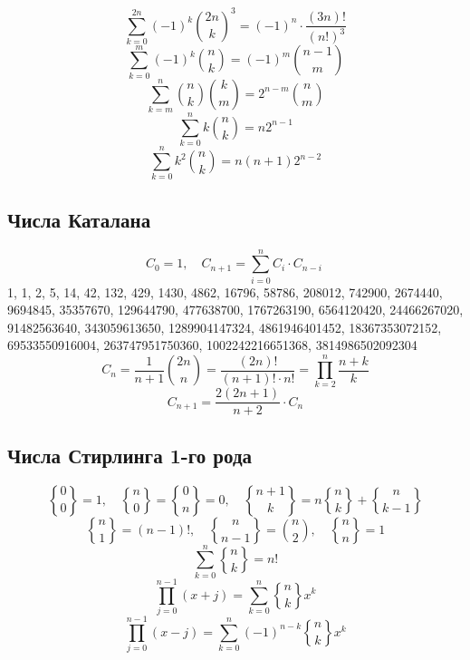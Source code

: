 \documentclass[11.5pt,a4paper,landscape,oneside]{amsart}
\newcommand{\Sequence}[1]{\subsection{#1}}
\newcommand{\stirlingii}{\genfrac{\{}{\}}{0pt}{}}
\begin{document}
\begin{multicols*}{2}
	\begin{equation}
		\sum_{k=0}^{2n}(-1)^k\binom{2n}{k}^3=(-1)^n\cdot\frac{(3n)!}{(n!)^3}
	\end{equation}
	\begin{equation}
		\sum_{k=0}^m (-1)^k\binom{n}{k} = (-1)^m\binom{n-1}{m}
	\end{equation}
	\begin{equation}
		\sum_{k=m}^n \binom{n}{k}\binom{k}{m} = 2^{n-m}\binom{n}{m}
	\end{equation}
	\begin{equation}
		\sum_{k=0}^n k \binom{n}{k} = n 2^{n-1}
	\end{equation}
	\begin{equation}
		\sum_{k=0}^n k^2 \binom{n}{k} = n(n + 1)2^{n-2}
	\end{equation}
	\Sequence{Числа Каталана}
	\begin{equation}
		C_0 = 1,\quad C_{n+1}=\sum_{i=0}^{n}C_i\cdot C_{n-i}\
	\end{equation}
	1, 1, 2, 5, 14, 42, 132, 429, 1430, 4862, 16796, 58786, 208012, 742900, 2674440, 9694845, 35357670, 129644790, 477638700, 1767263190, 6564120420, 24466267020, 91482563640, 343059613650, 1289904147324, 4861946401452, 18367353072152, 69533550916004, 263747951750360, 1002242216651368, 3814986502092304
	\begin{equation}
		C_n = \frac{1}{n+1}\binom{2n}{n} = \frac{(2n)!}{(n+1)!\cdot n!} = \prod_{k=2}^{n}\frac{n+k}{k}
	\end{equation}
	\begin{equation}
		C_{n+1}=\frac{2(2n+1)}{n+2}\cdot C_n
	\end{equation}
	\Sequence{Числа Стирлинга 1-го рода}
	\begin{equation}
		\stirlingii{0}{0} = 1,\quad\stirlingii{n}{0}=\stirlingii{0}{n}=0,\quad\stirlingii{n+1}{k} = n \stirlingii{n}{k} + \stirlingii{n}{k-1}
	\end{equation}
	\begin{equation}
		\stirlingii{n}{1} = (n-1)!,\quad\stirlingii{n}{n-1}=\binom{n}{2},\quad\stirlingii{n}{n}=1
	\end{equation}
	\begin{equation}
		\sum_{k=0}^n\stirlingii{n}{k} = n!
	\end{equation}
	\begin{equation}
		\prod_{j=0}^{n-1}(x+j)=\sum_{k=0}^n \stirlingii{n}{k}x^k
	\end{equation}
	\begin{equation}
		\prod_{j=0}^{n-1}(x-j)=\sum_{k=0}^n (-1)^{n-k}\stirlingii{n}{k}x^k

\end{equation}
\end{multicols*}
\end{document}

